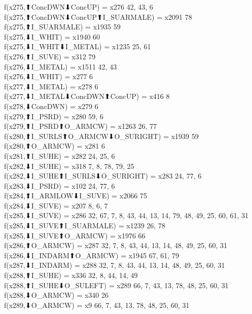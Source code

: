 f(x275,⬆ConcDWN⬇ConcUP) = x276 {42, 43, 6} \\
f(x275,⬆ConcDWN⬇ConcUP⬆I_SUARMALE) = x2091 {78} \\
f(x275,⬆I_SUARMALE) = x1935 {59} \\
f(x275,⬇I_WHIT) = x1940 {60} \\
f(x275,⬇I_WHIT⬇I_METAL) = x1235 {25, 61} \\
f(x276,⬆I_SUVE) = x312 {79} \\
f(x276,⬇I_METAL) = x1511 {42, 43} \\
f(x276,⬇I_WHIT) = x277 {6} \\
f(x277,⬇I_METAL) = x278 {6} \\
f(x277,⬇I_METAL⬇ConcDWN⬆ConcUP) = x416 {8} \\
f(x278,⬇ConcDWN) = x279 {6} \\
f(x279,⬆I_PSRD) = x280 {59, 6} \\
f(x279,⬆I_PSRD⬆O_ARMCW) = x1263 {26, 77} \\
f(x280,⬆I_SURLS⬆O_ARMCW⬇O_SURIGHT) = x1939 {59} \\
f(x280,⬆O_ARMCW) = x281 {6} \\
f(x281,⬆I_SUHE) = x282 {24, 25, 6} \\
f(x282,⬇I_SUHE) = x318 {7, 8, 78, 79, 25} \\
f(x282,⬇I_SUHE⬆I_SURLS⬇O_SURIGHT) = x283 {24, 77, 6} \\
f(x283,⬇I_PSRD) = x102 {24, 77, 6} \\
f(x284,⬆I_ARMLOW⬇I_SUVE) = x2066 {75} \\
f(x284,⬇I_SUVE) = x207 {8, 6, 7} \\
f(x285,⬇I_SUVE) = x286 {32, 67, 7, 8, 43, 44, 13, 14, 79, 48, 49, 25, 60, 61, 31} \\
f(x285,⬇I_SUVE⬆I_SUARMALE) = x1239 {26, 78} \\
f(x285,⬇I_SUVE⬆O_ARMCW) = x1976 {66} \\
f(x286,⬆O_ARMCW) = x287 {32, 7, 8, 43, 44, 13, 14, 48, 49, 25, 60, 31} \\
f(x286,⬇I_INDARM⬆O_ARMCW) = x1945 {67, 61, 79} \\
f(x287,⬇I_INDARM) = x288 {32, 7, 8, 43, 44, 13, 14, 48, 49, 25, 60, 31} \\
f(x288,⬆I_SUHE) = x336 {32, 8, 44, 14, 49} \\
f(x288,⬆I_SUHE⬇O_SULEFT) = x289 {66, 7, 43, 13, 78, 48, 25, 60, 31} \\
f(x288,⬇O_ARMCW) = x340 {26} \\
f(x289,⬇O_ARMCW) = x9 {66, 7, 43, 13, 78, 48, 25, 60, 31} \\

